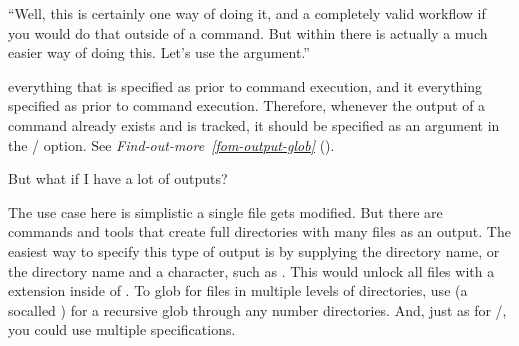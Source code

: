 \sphinxAtStartPar
“Well, this is certainly one way of doing it, and a completely valid workflow
if you would do that outside of a  command.
But within  there is actually a much easier way of doing this.
Let’s use the  argument.”

\sphinxAtStartPar
{}  everything that is specified as  prior to
command execution, and it  everything specified as  prior to
command execution. Therefore, whenever the output of a  command already
exists and is tracked, it should be specified as an argument in
the / option. See \textit{Find-out-more}~{\findoutmoreiconinline}\textit{\ref{fom-output-glob}} {\hyperref[\detokenize{basics/101-110-run2:fom-output-glob}]{}} ().

\ignorespaces \begin{findoutmore}[label={fom-output-glob}, before title={\thetcbcounter\ }, float, floatplacement=tb, check odd page=true]{But what if I have a lot of outputs?}
\label{\detokenize{basics/101-110-run2:fom-output-glob}}

\sphinxAtStartPar
The use case here is simplistic \textendash{} a single file gets modified.
But there are commands and tools that create full directories with
many files as an output.
The easiest way to specify this type of output
is by supplying the directory name, or the directory name and a {\hyperref[\detokenize{glossary:term-globbing}]{}} character, such as
.
This would unlock all files with a  extension inside of .
To glob for files in multiple levels of directories, use \sphinxcode{\sphinxupquote{**}} (a so\sphinxhyphen{}called ) for a recursive glob through any number directories.
And, just as for /, you could use multiple  specifications.


\end{findoutmore}

